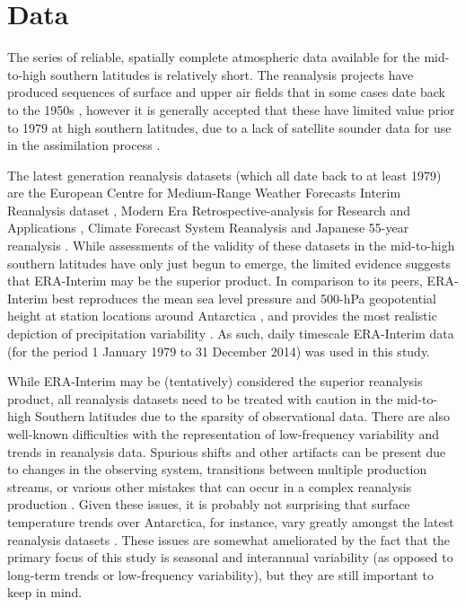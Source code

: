 \section{Data}\label{s:data}

The series of reliable, spatially complete atmospheric data available for the mid-to-high southern latitudes is relatively short. The reanalysis projects have produced sequences of surface and upper air fields that in some cases date back to the 1950s \citep{Kistler2001,Uppala2005,Kobayashi2015}, however it is generally accepted that these have limited value prior to 1979 at high southern latitudes, due to a lack of satellite sounder data for use in the assimilation process \citep{Hines2000}.

The latest generation reanalysis datasets (which all date back to at least 1979) are the European Centre for Medium-Range Weather Forecasts Interim Reanalysis dataset \citep[ERA-Interim;][]{Dee2011}, Modern Era Retrospective-analysis for Research and Applications \citep[Merra;][]{Rienecker2011}, Climate Forecast System Reanalysis \citep[CFSR;][]{Saha2010} and Japanese 55-year reanalysis \citep[JRA-55;][]{Kobayashi2015}. While assessments of the validity of these datasets in the mid-to-high southern latitudes have only just begun to emerge, the limited evidence suggests that ERA-Interim may be the superior product. In comparison to its peers, ERA-Interim best reproduces the mean sea level pressure and 500-hPa geopotential height at station locations around Antarctica \citep{Bracegirdle2012}, and provides the most realistic depiction of precipitation variability \citep{Bromwich2011,Nicolas2011}. As such, daily timescale ERA-Interim data (for the period 1 January 1979 to 31 December 2014) was used in this study.

While ERA-Interim may be (tentatively) considered the superior reanalysis product, all reanalysis datasets need to be treated with caution in the mid-to-high Southern latitudes due to the sparsity of observational data. There are also well-known difficulties with the representation of low-frequency variability and trends in reanalysis data. Spurious shifts and other artifacts can be present due to changes in the observing system, transitions between multiple production streams, or various other mistakes that can occur in a complex reanalysis production \citep{Dee2014}. Given these issues, it is probably not surprising that surface temperature trends over Antarctica, for instance, vary greatly amongst the latest reanalysis datasets \citep{Nicolas2014}. These issues are somewhat ameliorated by the fact that the primary focus of this study is seasonal and interannual variability (as opposed to long-term trends or low-frequency variability), but they are still important to keep in mind.
